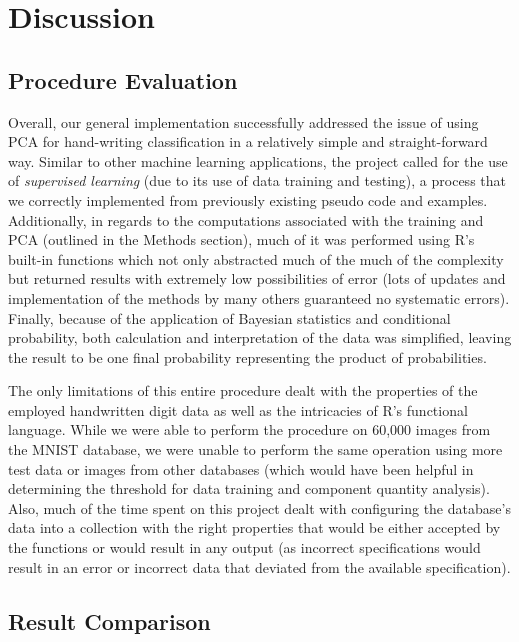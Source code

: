 \documentclass[twocolumn]{article}
\begin{document}
\section{Discussion}
\subsection{Procedure Evaluation}
\label{subsec:eval}

Overall, our general implementation successfully addressed the issue of using PCA for hand-writing classification in a relatively simple and straight-forward way. Similar to other machine learning applications, the project called for the use of  \emph{supervised learning} (due to its use of data training and testing), a process that we correctly implemented from previously existing pseudo code and examples. Additionally, in regards to the computations associated with the training and PCA (outlined in the Methods section), much of it was performed using R's built-in functions which not only abstracted much of the much of the complexity but returned results with extremely low possibilities of error (lots of updates and implementation of the methods by many others guaranteed no systematic errors). Finally, because of the application of Bayesian statistics and conditional probability, both calculation and interpretation of the data was simplified, leaving the result to be one final probability representing the product of probabilities. 

The only limitations of this entire procedure dealt with the properties of the employed handwritten digit data as well as the intricacies of R's functional language. While we were able to perform the procedure on 60,000 images from the MNIST database, we were unable to perform the same operation using more test data or images from other databases (which would have been helpful in determining the threshold for data training and component quantity analysis). Also, much of the time spent on this project dealt with configuring the database's data into a collection with the right properties that would be either accepted by the functions or would result in any output (as incorrect specifications would result in an error or incorrect data that deviated from the available specification).

\subsection{Result Comparison}
\label{subsec:comparison}
\end{document}
